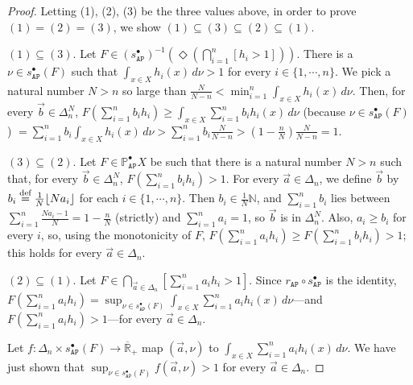 \documentclass[preprint,12pt]{elsarticle}
\newcommand\eqdef{\mathrel{\buildrel \text{def}\over=}}
\newcommand{\creal}{\overline{\mathbb{R}}_+}
\newcommand\nat{\mathbb{N}}
\newcommand\Pred{\mathbb{P}}
\newcommand\Angel{{\mathtt{A}}}
\newcommand\Nature{{\mathtt{P}}}
\newcommand\AN{{\Angel\Nature}}
\begin{document}
\begin{proof}
  Letting (1), (2), (3) be the three values above, in order to prove
  $(1)=(2)=(3)$, we show $(1) \subseteq (3) \subseteq (2) \subseteq
  (1)$.

  $(1) \subseteq (3)$.  Let
  $F \in {(s_\AN^\bullet)}^{-1} (\Diamond {(\bigcap_{i=1}^n [h_i >
    1])})$.  There is a $\nu \in s_\AN^\bullet (F)$ such that
  $\int_{x \in X} h_i (x) \,d\nu > 1$ for every
  $i \in \{1, \cdots, n\}$.  We pick a natural number $N > n$ so large
  than $\frac N {N-n} < \min_{i=1}^n \int_{x \in X} h_i (x) \,d\nu$.
  Then, for every $\vec b \in \Delta_n^N$,
  $F (\sum_{i=1}^n b_i h_i) \geq \int_{x \in X} \sum_{i=1}^n b_i h_i
  (x) \,d\nu$ (because $\nu \in s_\AN^\bullet (F)$)
  $= \sum_{i=1}^n b_i \int_{x \in X} h_i (x) \,d\nu > \sum_{i=1}^n b_i
  \frac N {N-n} > (1 - \frac n N) \frac N {N-n} = 1$.

  $(3) \subseteq (2)$.  Let $F \in \Pred_\AN^\bullet X$ be such that
  there is a natural number $N > n$ such that, for every
  $\vec b \in \Delta_n^N$, $F (\sum_{i=1}^n b_i h_i) > 1$.  For every
  $\vec a \in \Delta_n$, we define $\vec b$ by
  $b_i \eqdef \frac 1 N \lfloor N a_i \rfloor$ for each
  $i \in \{1, \cdots, n\}$.  Then $b_i \in \frac 1 N \nat$, and
  $\sum_{i=1}^n b_i$ lies between
  $\sum_{i=1}^n \frac {Na_i - 1} N = 1 - \frac n N$ (strictly) and
  $\sum_{i=1}^n a_i = 1$, so $\vec b$ is in $\Delta_n^N$.  Also,
  $a_i \geq b_i$ for every $i$, so, using the monotonicity of $F$,
  $F (\sum_{i=1}^n a_i h_i) \geq F (\sum_{i=1}^n b_i h_i) > 1$; this
  holds for every $\vec a \in \Delta_n$.

  $(2) \subseteq (1)$.  Let
  $F \in \bigcap_{\vec a \in \Delta_n} [\sum_{i=1}^n a_i h_i > 1]$.
  Since $r_\AN \circ s_\AN^\bullet$ is the identity,
  $F (\sum_{i=1}^n a_i h_i) = \sup_{\nu \in s_\AN^\bullet (F)} \int_{x
    \in X} \sum_{i=1}^n a_i h_i (x) \,d\nu$---and
  $F (\sum_{i=1}^n a_i h_i) > 1$---for every $\vec a \in \Delta_n$.

  Let $f \colon \Delta_n \times s_\AN^\bullet (F) \to \creal$ map
  $(\vec a, \nu)$ to $\int_{x \in X} \sum_{i=1}^n a_i h_i (x) \,d\nu$.
  We have just shown that
  $\sup_{\nu \in s_\AN^\bullet (F)} f (\vec a, \nu) > 1$ for every
  $\vec a \in \Delta_n$.
  

\end{proof}
\end{document}
